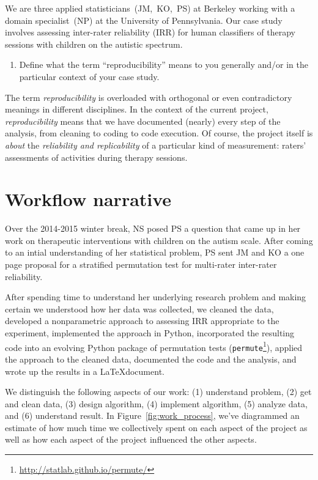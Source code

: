 \documentclass[]{article}
\begin{document}
We are three applied statisticians~(JM,~KO,~PS) at Berkeley working with a
domain specialist~(NP) at the University of Pennsylvania. Our case study
involves assessing inter-rater reliability (IRR) for human classifiers of
therapy sessions with children on the autistic spectrum.

\begin{enumerate}
\def\labelenumi{\arabic{enumi})}
\setcounter{enumi}{1}
\itemsep1pt\parskip0pt
\item
  Define what the term ``reproducibility'' means to you generally and/or
  in the particular context of your case study.
\end{enumerate}

The term \emph{reproducibility} is overloaded with orthogonal or even
contradictory meanings in different disciplines. In the context of the current
project, \emph{reproducibility} means that we have documented (nearly) every
step of the analysis, from cleaning to coding to code execution. Of course, the
project itself is \emph{about} the \emph{reliability and replicability} of a
particular kind of measurement: raters' assessments of activities during
therapy sessions.

\section{Workflow narrative}\label{workflow-narrative}

Over the 2014-2015 winter break, NS posed PS a question that came up in her
work on therapeutic interventions with children on the autism scale.
After coming to an intial understanding of her statistical problem,
PS sent JM and KO a one page proposal for a stratified permutation test for
multi-rater inter-rater reliability.

After spending time to understand her underlying research problem and making
certain we understood how her data was collected, we cleaned the data,
developed a nonparametric approach to assessing IRR appropriate to the
experiment, implemented the approach in Python, incorporated the resulting
code into an evolving Python package of permutation
tests (\texttt{permute}\footnote{\url{http://statlab.github.io/permute/}}),
applied the approach to the cleaned data, documented the code and the analysis,
and wrote up the results in a \LaTeX document. 

We distinguish the following aspects of our work:
(1) understand problem,
(2) get and clean data,
(3) design algorithm,
(4) implement algorithm,
(5) analyze data, and
(6) understand result.
In Figure~\ref{fig:work_process}, we've diagrammed an estimate of how much time
we collectively spent on each aspect of the project as well as how each aspect
of the project influenced the other aspects.
\end{document}
